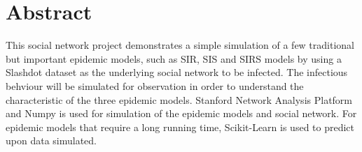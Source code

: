 \documentclass{subfile}
\begin{document}
  \section{Abstract}
  This social network project demonstrates a simple simulation of a few traditional but important epidemic models, such as SIR, SIS and SIRS models by using a Slashdot dataset as the underlying social network to be infected. The infectious behviour will be simulated for observation in order to understand the characteristic of the three epidemic models. Stanford Network Analysis Platform and Numpy is used for simulation of the epidemic models and social network. For epidemic models that require a long running time, Scikit-Learn is used to predict upon data simulated.
\end{document}
